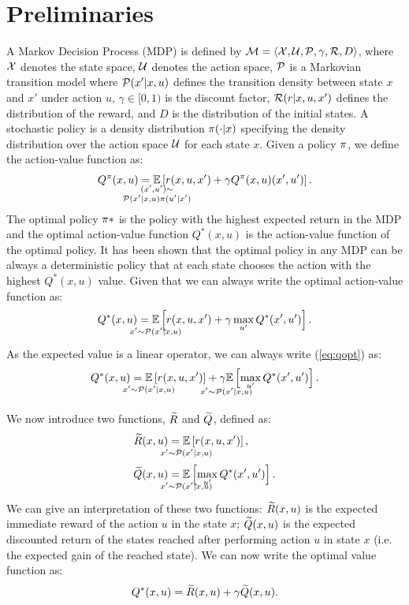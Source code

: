 \documentclass[conference]{IEEEtran}
\begin{document}
\section{Preliminaries}
A Markov Decision Process (MDP) is defined by $\mathcal{M} = \langle \mathcal X,\mathcal U,\mathcal{P},\gamma,\mathcal{R}, D\rangle$, where $\mathcal X$ denotes the state space, $\mathcal U$ denotes the action space, $\mathcal{P}$ is a Markovian transition model where $\mathcal{P}(x'|x,u)$ defines the transition density between state $x$ and $x'$ under action $u$, $\gamma\in[0,1)$ is the discount factor, $\mathcal{R}(r|x, u, x')$ defines the distribution of the reward, and $D$ is the distribution of the initial states.
A stochastic policy is a density distribution $\pi(\cdot|x)$ specifying the density distribution over the action space $\mathcal U$ for each state $x$.
Given a policy $\pi$, we define the action-value function as:
\begin{align}
 Q^\pol(x,u)=\underset{\strut\mathclap{\substack{(x', u')\sim \\ \Pmodel(x'|x,u)\pol(u'|x')}}}{\mathbb{E}}\left[ r(x,u,x')+\gamma Q^\pol(x,u)(x',u')\right].
 \label{eq:qpol}
\end{align}
The optimal policy $\pi*$ is the policy with the highest expected return in the MDP and the optimal action-value function $Q^*(x, u)$ is the action-value function of the optimal policy.
It has been shown that the optimal policy in any MDP can be always a deterministic policy that at each state chooses the action with the highest $Q^*(x, u)$ value.
Given that we can always write the optimal action-value function as:
\begin{align}
 Q^*(x,u)=\underset{\strut\mathclap{x'\sim \Pmodel(x'|x,u)}}{\mathbb{E}}\left[ r(x,u,x')+\gamma\max_{u'} Q^*(x',u')\right].
 \label{eq:qopt}
\end{align}
As the expected value is a linear operator, we can always write (\ref{eq:qopt}) as:
\begin{align}
 Q^*(x,u)=\underset{\strut\mathclap{x'\sim \Pmodel(x'|x,u)}}{\mathbb{E}}\left[ r(x,u,x')\right]+\underset{\strut\mathclap{x'\sim \Pmodel(x'|x,u)}}{\gamma\mathbb{E}}\left[ \max_{u'} Q^*(x',u')\right].
 \label{eq:qdec}
\end{align}

We now introduce two functions, $\widetilde{R}$ and $\widetilde{Q}$, defined as:
\begin{align}
 \Rtilde(x,u)&=\underset{\strut\mathclap{x'\sim \Pmodel(x'|x,u)}}{\mathbb{E}}\left[ r(x,u,x')\right], \nonumber\ \\
 \Qtilde(x,u)&=\underset{\strut\mathclap{x'\sim \Pmodel(x'|x,u)}}{\mathbb{E}}\left[\max_{u'} Q^*(x',u')\right].
 \label{eq:rqtilde}
\end{align}
We can give an interpretation of these two functions: $\widetilde{R}(x,u)$ is the expected immediate reward of the action $u$ in the state $x$; $\widetilde{Q}(x,u)$ is the expected discounted return of the states reached after performing action $u$ in state $x$ (i.e. the expected gain of the reached state).
We can now write the optimal value function as:
\begin{align}
 Q^*(x,u)=\Rtilde(x,u)+\gamma\Qtilde(x,u).
 \label{eq:qdecrqtilde}
\end{align}
\end{document}
